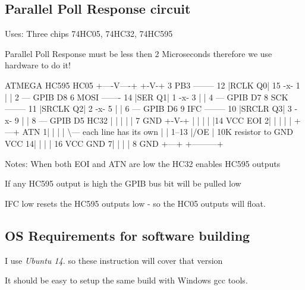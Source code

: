 \subsection*{Parallel Poll Response circuit}


\begin{DoxyItemize}
\item Uses\-: Three chips 74\-H\-C05, 74\-H\-C32, 74\-H\-C595
\item Parallel Poll Response must be less then 2 Microseconds therefore we use hardware to do it!
\end{DoxyItemize}


\begin{DoxyPre}
    ATMEGA               HC595             HC05 
                      +----V----+          +-V-+  
    3 PB3 -------- 12 |RCLK   Q0| 15 -x- 1 |   | 2 --- GPIB D8 
    6 MOSI ------- 14 |SER    Q1| 1  -x- 3 |   | 4 --- GPIB D7 
    8 SCK -------- 11 |SRCLK  Q2| 2  -x- 5 |   | 6 --- GPIB D6 
    9 IFC -------- 10 |SRCLR  Q3| 3  -x- 9 |   | 8 --- GPIB D5 
           HC32       |         |     |    |   | 7 GND 
          +-V-+       |         |     |    |   |14 VCC 
     EOI 2|   |       |         |     |    +---+ 
     ATN 1|   |       |         |     \textbackslash{}--- each line has its own 
          |   | 1--13 |/OE      |          10K resistor to GND 
    VCC 14|   |       |         | 16 VCC 
    GND  7|   |       |         |  8 GND 
          +---+       +---------+ 
\end{DoxyPre}


Notes\-: When both E\-O\-I and A\-T\-N are low the H\-C32 enables H\-C595 outputs
\begin{DoxyItemize}
\item If any H\-C595 output is high the G\-P\-I\-B bus bit will be pulled low
\item I\-F\-C low resets the H\-C595 outputs low -\/ so the H\-C05 outputs will float.
\end{DoxyItemize}

\subsection*{O\-S Requirements for software building}


\begin{DoxyItemize}
\item I use {\itshape Ubuntu 14.} so these instruction will cover that version
\begin{DoxyItemize}
\item It should be easy to setup the same build with Windows gcc tools.
\end{DoxyItemize}
\end{DoxyItemize}


